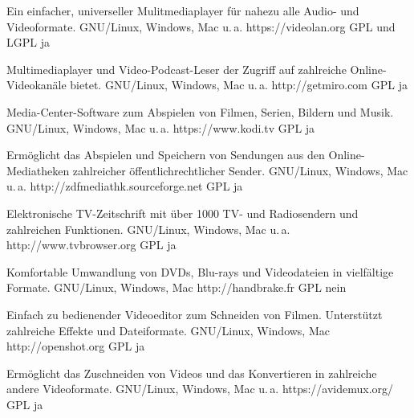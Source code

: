 




{Ein einfacher, universeller Mulitmediaplayer für nahezu alle Audio- und Videoformate.}
{GNU/Linux, Windows, Mac u.\,a.}
{https://videolan.org}
{GPL und LGPL}
{ja}

{Multimediaplayer und Video-Podcast-Leser der Zugriff auf zahlreiche Online-Videokanäle bietet.}
{GNU/Linux, Windows, Mac u.\,a.}
{http://getmiro.com}
{GPL}
{ja}

{Media-Center-Software zum Abspielen von Filmen, Serien, Bildern und Musik.}
{GNU/Linux, Windows, Mac u.\,a.}
{https://www.kodi.tv}
{GPL}
{ja}

{Ermöglicht das Abspielen und Speichern von Sendungen aus den Online-Mediatheken zahlreicher öffentlichrechtlicher Sender.}
{GNU/Linux, Windows, Mac u.\,a.}
{http://zdfmediathk.sourceforge.net}
{GPL}
{ja}


{Elektronische TV-Zeitschrift mit über 1000 TV- und Radiosendern und zahlreichen Funktionen.}
{GNU/Linux, Windows, Mac u.\,a.}
{http://www.tvbrowser.org}
{GPL}
{ja}

{Komfortable Umwandlung von DVDs, Blu-rays und Videodateien in vielfältige Formate.}
{GNU/Linux, Windows, Mac}
{http://handbrake.fr}
{GPL}
{nein}

{Einfach zu bedienender Videoeditor zum Schneiden von Filmen. Unterstützt zahlreiche Effekte und Dateiformate.}
{GNU/Linux, Windows, Mac}
{http://openshot.org}
{GPL}
{ja}

{Ermöglicht das Zuschneiden von Videos und das Konvertieren in zahlreiche andere Videoformate.}
{GNU/Linux, Windows, Mac u.\,a.}
{https://avidemux.org/}
{GPL}
{ja}

\backpage


